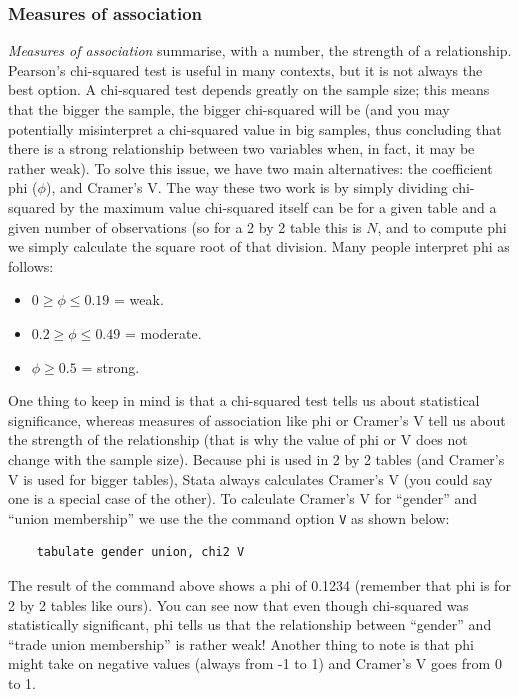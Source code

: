 \documentclass{article}
\begin{document}
\subsubsection*{Measures of association}

\textit{Measures of association} summarise, with a number, the strength of a relationship. Pearson’s chi-squared test is useful in many contexts, but it is not always the best option. A chi-squared test depends greatly on the sample size; this means that the bigger the sample, the bigger chi-squared will be (and you may potentially misinterpret a chi-squared value in big samples, thus concluding that there is a strong relationship between two variables when, in fact, it may be rather weak). To solve this issue, we have two main alternatives: the coefficient phi ($\phi$), and Cramer's V. The way these two work is by simply dividing chi-squared by the maximum value chi-squared itself can be for a given table and a given number of observations (so for a 2 by 2 table this is $N$, and to compute phi we simply calculate the square root of that division. Many people interpret phi as follows:

\begin{itemize}
	\item $0 \geq \phi \leq 0.19$ = weak.
	\item $0.2 \geq \phi \leq 0.49$ = moderate.
	\item $\phi \geq 0.5$ = strong.
\end{itemize}

One thing to keep in mind is that a chi-squared test tells us about statistical significance, whereas measures of association like phi or Cramer's V tell us about the strength of the relationship (that is why the value of phi or V does not change with the sample size). Because phi is used in 2 by 2 tables (and Cramer's V is used for bigger tables), Stata always calculates Cramer's V (you could say one is a special case of the other). To calculate Cramer's V for ``gender'' and ``union membership'' we use the the command option \texttt{V} as shown below:

\begin{lstlisting}
	tabulate gender union, chi2 V
\end{lstlisting}

The result of the command above shows a phi of 0.1234 (remember that phi is for 2 by 2 tables like ours). You can see now that even though chi-squared was statistically significant, phi tells us that the relationship between ``gender'' and ``trade union membership'' is rather weak! Another thing to note is that phi might take on negative values (always from -1 to 1) and Cramer's V goes from 0 to 1.

	
\end{document}
